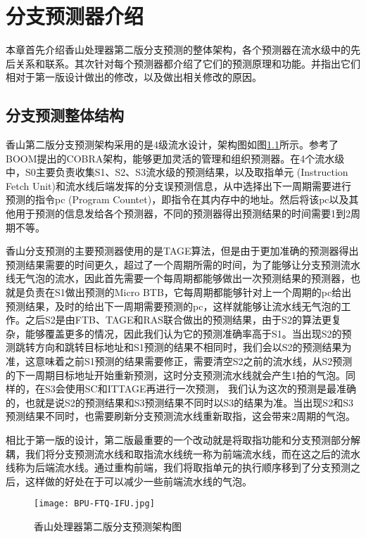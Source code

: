 \chapter{分支预测器介绍}


本章首先介绍香山处理器第二版分支预测的整体架构，各个预测器在流水级中的先后关系和联系。其次针对每个预测器都介绍了它们的预测原理和功能。并指出它们相对于第一版设计做出的修改，以及做出相关修改的原因。

\section{分支预测整体结构}

香山第二版分支预测架构采用的是4级流水设计，架构图如图\ref{fig:figure21}所示。参考了BOOM提出的COBRA架构\cite{cobra}，能够更加灵活的管理和组织预测器。在4个流水级中，S0主要负责收集S1、S2、S3流水级的预测结果，以及取指单元 (Instruction Fetch Unit)和流水线后端发挥的分支误预测信息，从中选择出下一周期需要进行预测的指令pc (Program Countet)，即指令在其内存中的地址。然后将该pc以及其他用于预测的信息发给各个预测器，不同的预测器得出预测结果的时间需要1到2周期不等。

香山分支预测的主要预测器使用的是TAGE算法\cite{tage-sc-l}，但是由于更加准确的预测器得出预测结果需要的时间更久，超过了一个周期所需的时间，为了能够让分支预测流水线无气泡的流水，因此首先需要一个每周期都能够做出一次预测结果的预测器，也就是负责在S1做出预测的Micro BTB，它每周期都能够针对上一个周期的pc给出预测结果，及时的给出下一周期需要预测的pc，这样就能够让流水线无气泡的工作。之后S2是由FTB、TAGE和RAS联合做出的预测结果，由于S2的算法更复杂，能够覆盖更多的情况，因此我们认为它的预测准确率高于S1。当出现S2的预测跳转方向和跳转目标地址和S1预测的结果不相同时，我们会以S2的预测结果为准，这意味着之前S1预测的结果需要修正，需要清空S2之前的流水线，从S2预测的下一周期目标地址开始重新预测，这时分支预测流水线就会产生1拍的气泡。同样的，在S3会使用SC和ITTAGE再进行一次预测， 我们认为这次的预测是最准确的，也就是说S2的预测结果和S3预测结果不同时以S3的结果为准。当出现S2和S3预测结果不同时，也需要刷新分支预测流水线重新取指，这会带来2周期的气泡。

相比于第一版的设计，第二版最重要的一个改动就是将取指功能和分支预测部分解耦，我们将分支预测流水线和取指流水线统一称为前端流水线，而在这之后的流水线称为后端流水线。通过重构前端，我们将取指单元的执行顺序移到了分支预测之后，这样做的好处在于可以减少一些前端流水线的气泡。

\begin{figure}[htb]
	\centering
	\setlength\tabcolsep{3pt}  %
	\vspace{5pt} %
	\texttt{[image: BPU-FTQ-IFU.jpg]}
	\caption{香山处理器第二版分支预测架构图}
	\label{fig:figure21}
\end{figure}

